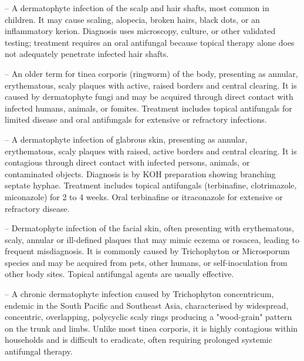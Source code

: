 -- A dermatophyte infection of the scalp and hair shafts, most common in children. It may cause scaling, alopecia, broken hairs, black dots, or an inflammatory kerion. Diagnosis uses microscopy, culture, or other validated testing; treatment requires an oral antifungal because topical therapy alone does not adequately penetrate infected hair shafts.

-- An older term for tinea corporis (ringworm) of the body, presenting as annular, erythematous, scaly plaques with active, raised borders and central clearing. It is caused by dermatophyte fungi and may be acquired through direct contact with infected humans, animals, or fomites. Treatment includes topical antifungals for limited disease and oral antifungals for extensive or refractory infections.

-- A dermatophyte infection of glabrous skin, presenting as annular, erythematous, scaly plaques with raised, active borders and central clearing. It is contagious through direct contact with infected persons, animals, or contaminated objects. Diagnosis is by KOH preparation showing branching septate hyphae. Treatment includes topical antifungals (terbinafine, clotrimazole, miconazole) for 2 to 4 weeks. Oral terbinafine or itraconazole for extensive or refractory disease.

-- Dermatophyte infection of the facial skin, often presenting with erythematous, scaly, annular or ill-defined plaques that may mimic eczema or rosacea, leading to frequent misdiagnosis. It is commonly caused by Trichophyton or Microsporum species and may be acquired from pets, other humans, or self-inoculation from other body sites. Topical antifungal agents are usually effective.

-- A chronic dermatophyte infection caused by Trichophyton concentricum, endemic in the South Pacific and Southeast Asia, characterised by widespread, concentric, overlapping, polycyclic scaly rings producing a "wood-grain" pattern on the trunk and limbs. Unlike most tinea corporis, it is highly contagious within households and is difficult to eradicate, often requiring prolonged systemic antifungal therapy.

